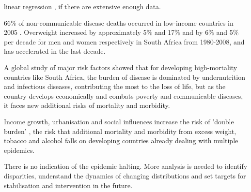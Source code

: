 \documentclass[12pt,a4paper]{article}
\renewcommand{\baselinestretch}{1.5}
\begin{document}
 linear regression \citep{ladabaum2014}, if there are extensive enough data. 








66\% of non-communicable disease deaths occurred in low-income countries in 2005 \citep{whobook}. Overweight increased by approximately  5\% and 17\% and by 6\% and 5\% per decade for men and women respectively in South Africa from 1980-2008, and has accelerated in the last decade\citep{stevens12}.


A global study of major risk factors \citep{ezzati02} showed that for developing high-mortality countries like South Africa, the burden of disease is dominated by undernutrition and infectious diseases, contributing the most to the loss of life, but as the country develops economically and combats poverty and communicable diseases, it faces new additional risks of mortality and morbidity. 

Income growth, urbanisation and social influences increase the risk of 'double burden' \citep{prentice06}, the risk that additional mortality and morbidity from excess weight, tobacco and alcohol falls on developing countries already dealing with multiple epidemics. 

There is no indication of the epidemic halting. More analysis is needed to identify disparities, understand the dynamics of changing distributions and set targets for stabilisation and intervention in the future. 


\renewcommand{\baselinestretch}{1}

\newpage



\label{ch:bibliography}



\renewcommand{\baselinestretch}{1.5}
\end{document}
